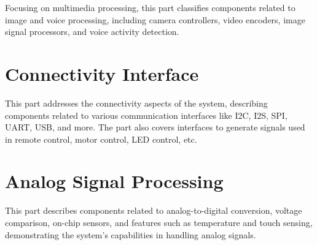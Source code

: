 \documentclass[openany, 10pt]{book}
\begin{document}
Focusing on multimedia processing, this part classifies components related to image and voice processing, including camera controllers, video encoders, image signal processors, and voice activity detection.


\part{Connectivity Interface}


This part addresses the connectivity aspects of the system, describing components related to various communication interfaces like I2C, I2S, SPI, UART, USB, and more. The part also covers interfaces to generate signals used in remote control, motor control, LED control, etc.



\part{Analog Signal Processing}


This part describes components related to analog-to-digital conversion, voltage comparison, on-chip sensors, and features such as temperature and touch sensing, demonstrating the system's capabilities in handling analog signals.

\end{document}
